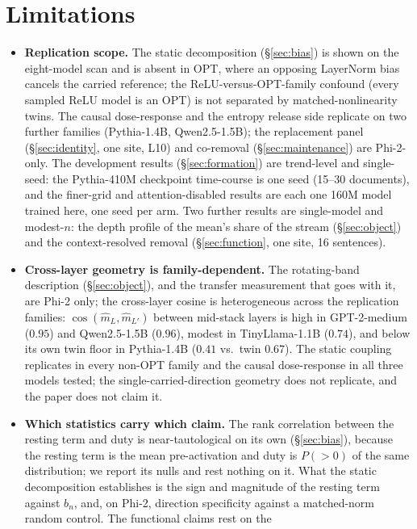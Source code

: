 \documentclass[11pt]{article}
\newcommand{\mhat}{\hat{m}}
\begin{document}
\section{Limitations}

\begin{itemize}
\item \textbf{Replication scope.} The static decomposition
  (\S\ref{sec:bias}) is shown on the eight-model scan and is absent in
  OPT, where an opposing LayerNorm bias cancels the carried reference;
  the ReLU-versus-OPT-family confound (every sampled ReLU model is an
  OPT) is not separated by matched-nonlinearity twins. The causal
  dose-response and the entropy release side replicate on two further
  families (Pythia-1.4B, Qwen2.5-1.5B); the replacement panel
  (\S\ref{sec:identity}, one site, L10) and co-removal
  (\S\ref{sec:maintenance}) are Phi-2-only. The development results
  (\S\ref{sec:formation}) are trend-level and single-seed: the
  Pythia-410M checkpoint time-course is one seed (15--30 documents), and
  the finer-grid and attention-disabled results are each one 160M model
  trained here, one seed per arm. Two further results are single-model
  and modest-$n$: the depth profile of the mean's share of the
  stream (\S\ref{sec:object}) and the context-resolved removal
  (\S\ref{sec:function}, one site, 16 sentences).
\item \textbf{Cross-layer geometry is family-dependent.} The
  rotating-band description (\S\ref{sec:object}), and the transfer
  measurement that goes with it, are Phi-2 only; the cross-layer
  cosine is heterogeneous across the replication families: $\cos(\mhat_L, \mhat_{L'})$
  between mid-stack layers is high in GPT-2-medium ($0.95$) and
  Qwen2.5-1.5B ($0.96$), modest in TinyLlama-1.1B ($0.74$), and below
  its own twin floor in Pythia-1.4B ($0.41$ vs.\ twin $0.67$). The
  static coupling replicates in every non-OPT family and the causal
  dose-response in all three models tested; the single-carried-direction
  geometry does not replicate, and the paper does not claim it.
\item \textbf{Which statistics carry which claim.} The rank
  correlation between the resting term and duty is near-tautological
  on its own (\S\ref{sec:bias}), because the resting term is the mean
  pre-activation and duty is $P(>0)$ of the same distribution; we
  report its nulls and rest nothing on it. What the static
  decomposition establishes is the sign and magnitude of the resting
  term against $b_n$, and, on Phi-2, direction specificity against a
  matched-norm random control. The functional claims rest on the

\end{itemize}
\end{document}
